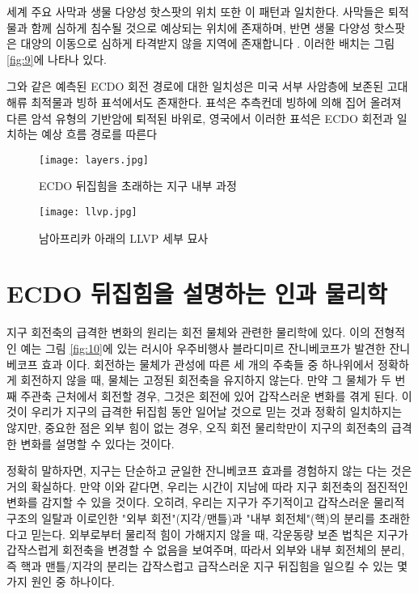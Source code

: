 \documentclass[10pt,twocolumn,letterpaper]{article}
\begin{document}
\begin{개요}
세계 주요 사막과 생물 다양성 핫스팟의 위치 또한 이 패턴과 일치한다. 사막들은 퇴적물과 함께 심하게 침수될 것으로 예상되는 위치에 존재하며, 반면 생물 다양성 핫스팟은 대양의 이동으로 심하게 타격받지 않을 지역에 존재합니다 \cite{28}. 이러한 배치는 그림 \ref{fig:9}에 나타나 있다.

그와 같은 예측된 ECDO 회전 경로에 대한 일치성은  미국 서부 사암층에 보존된 고대 해류 최적물과 빙하 표석에서도 존재한다. 표석은 추측컨데 빙하에 의해 집어 올려져 다른 암석 유형의 기반암에 퇴적된 바위로,  영국에서 이러한 표석은  ECDO 회전과 일치하는 예상 흐름 경로를 따른다 \cite{67,68}

\begin{figure*}[b]
\begin{center}
\texttt{[image: layers.jpg]}
\end{center}
   \caption{ECDO 뒤집힘을 초래하는 지구 내부 과정 \cite{129}}
\label{fig:11}
\end{figure*}

\begin{figure}[t]
\begin{center}
   \texttt{[image: llvp.jpg]}
\end{center}
   \caption{남아프리카 아래의 LLVP 세부 묘사 \cite{28}}
\label{fig:12}
\label{fig:onecol}
\end{figure}

\section{ECDO 뒤집힘을 설명하는 인과 물리학}

지구 회전축의 급격한 변화의 원리는 회전 물체와 관련한 물리학에 있다. 이의 전형적인 예는  그림 \ref{fig:10}에 있는 러시아 우주비행사 블라디미르 잔니베코프가 발견한 잔니베코프 효과 \cite{37}이다. 회전하는 물체가 관성에 따른 세 개의 주축들 중 하나위에서 정확하게 회전하지 않을 때, 물체는 고정된 회전축을 유지하지 않는다. 만약 그 물체가  두 번째 주관축 근처에서 회전할 경우, 그것은 회전에 있어 갑작스러운 변화를 겪게 된다. 이것이 우리가 지구의 급격한 뒤집힘 동안 일어날 것으로 믿는 것과 정확히 일치하지는 않지만, 중요한 점은 외부 힘이 없는 경우, 오직 회전 물리학만이 지구의 회전축의 급격한 변화를 설명할 수 있다는 것이다.

정확히 말하자면, 지구는 단순하고 균일한 잔니베코프 효과를 경험하지 않는 다는 것은 거의 확실하다. 만약 이와 같다면, 우리는 시간이 지남에 따라 지구 회전축의 점진적인 변화를 감지할 수 있을 것이다. 오히려, 우리는 지구가 주기적이고 갑작스러운 물리적 구조의 일탈과 이로인한 "외부 회전"(지각/맨틀)과 "내부 회전체"(핵)의 분리를 초래한다고 믿는다. 외부로부터 물리적 힘이 가해지지 않을 때, 각운동량 보존 법칙은 지구가 갑작스럽게 회전축을 변경할 수 없음을 보여주며, 따라서 외부와 내부 회전체의 분리, 즉 핵과 맨틀/지각의 분리는 갑작스럽고 급작스러운 지구 뒤집힘을 일으킬 수 있는 몇 가지 원인 중 하나이다.


\end{개요}
\end{document}
